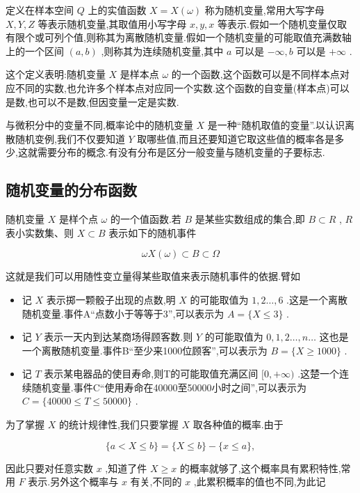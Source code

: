 \begin{definition}{}{}
	定义在样本空间 $ Q $ 上的实值函数 $ X=X(\omega) $ 称为随机变量,常用大写字母 $ X,Y,Z $ 等表示随机变量,其取值用小写字母 $ x,y,x $ 等表示.假如一个随机变量仅取有限个或可列个值,则称其为离散随机变量.假如一个随机变量的可能取值充满数轴上的一个区间 $ (a,b) $ ,则称其为连续随机变量,其中 $ a $ 可以是 $ -\infty ,b $ 可以是 $ +\infty $ .
\end{definition}


这个定义表明:随机变量 $ X $ 是样本点 $ \omega $ 的一个函数,这个函数可以是不同样本点对应不同的实数,也允许多个样本点对应同一个实数.这个函数的自变量(样本点)可以是数,也可以不是数,但因变量一定是实数.

与微积分中的变量不同,概率论中的随机变量 $ X $ 是一种“随机取值的变量”.以认识离散随机变例,我们不仅要知道 $ Y $ 取哪些值,而且还要知道它取这些值的概率各是多少,这就需要分布的概念.有没有分布是区分一般变量与随机变量的子要标志.

\subsection{随机变量的分布函数}

随机变量 $ X $ 是样个点 $ \omega $ 的一个值函数.若 $ B $ 是某些实数组成的集合,即 $ B\subset R $ , $ R $ 表小实数集、则 $ X\subset B $ 表示如下的随机事件

\[
\omega X(\omega)\subset B \subset \Omega
\]

这就是我们可以用随性变立量得某些取值来表示随机事件的依据.臂如

\begin{itemize}
	\item 记 $ X $ 表示掷一颗骰子出现的点数,明 $ X $ 的可能取值为 $ 1,2\dotsc ,6 $ .这是一个离散随机变量.事件A“点数小于等等于3”,可以表示为 $ A=\{X\leq 3\} $ .
	\item 记 $ Y $ 表示一天内到达某商场得顾客数.则 $ Y $ 的可能取值为 $ 0,1,2\dotsc ,n\dotsc $ 这也是一个离散随机变量.事件B“至少来1000位顾客”,可以表示为 $ B=\{ X\geq 1000 \} $ .
	\item 记 $ T $ 表示某电器品的使目寿命,则T的可能取值充满区间 $ [0,+\infty ) $ .这楚一个连续随机变量.事件C“使用寿命在40000至50000小时之间”,可以表示为 $ C=\{ 40000 \leq T \leq 50000 \} $ . 
\end{itemize}

为了掌握 $ X $ 的统计规律性,我们只要掌握 $ X $ 取各种值的概率.由于

\[
\{a < X \leq b \} = \{ X \leq b\} - \{x\leq a\},
\]

因此只要对任意实数 $ x $ ,知道了件 $ X\geq x $ 的概率就够了,这个概率具有累积特性,常用 $ F $ 表示.另外这个概率与 $ x $ 有关,不同的 $ x $ ,此累积概率的值也不同,为此记

